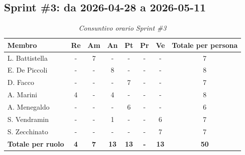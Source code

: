 ﻿\documentclass[a4paper, 10pt, colorlinks=true, linkcolor=black, urlcolor=blue, citecolor=blue, hidelinks]{article}
\renewcommand{\arraystretch}{1.2}
\begin{document}
\subsection{Sprint \#3: da 2026-04-28 a 2026-05-11}

\begin{table}[H]
    \centering
    \renewcommand{\arraystretch}{1.4}
    \begin{tabular}{|l|c|c|c|c|c|c|c|}
        \hline
        \rowcolor{bluBitless!15}
        \textbf{Membro} & \textbf{Re} & \textbf{Am} & \textbf{An} & \textbf{Pt} & \textbf{Pr} & \textbf{Ve} & \textbf{Totale per persona} \\
        \hline
        L. Battistella & - & 7 & - & - & - & - & 7 \\ \hline
        E. De Piccoli & - & - & 8 & - & - & - & 8 \\ \hline
        D. Facco & - & - & - & 7 & - & - & 7 \\ \hline
        A. Marini & 4 & - & 4 & - & - & - & 8 \\ \hline
        A. Menegaldo & - & - & - & 6 & - & - & 6 \\ \hline
        S. Vendramin & - & - & 1 & - & - & 6 & 7 \\ \hline
        S. Zecchinato & - & - & - & - & - & 7 & 7 \\ \hline
        \rowcolor{bluBitless!8}
        \textbf{Totale per ruolo} & \textbf{4} & \textbf{7} & \textbf{13} & \textbf{13} & \textbf{-} & \textbf{13} & \textbf{50} \\
        \hline
    \end{tabular}
    \caption{\textit{Consuntivo orario Sprint \#3}}
\end{table}
\end{document}
